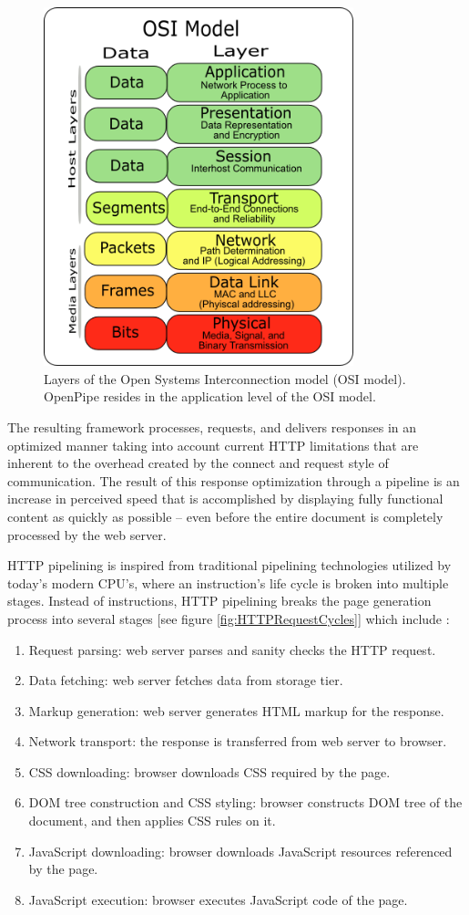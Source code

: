 \documentclass[12pt]{report}
\begin{document}
\begin{figure}[H]
\label{fig:osiModel}
\centering
\includegraphics[width=90mm]{figures/images/osi_model.png}
\caption{Layers of the Open Systems Interconnection model (OSI model). OpenPipe resides in the application level of the OSI model.}
\end{figure}

The resulting framework processes, requests, and delivers responses in an optimized manner taking into account current HTTP limitations that are inherent to the overhead created by the connect and request style of communication. The result of this response optimization through a pipeline is an increase in perceived speed that is accomplished by displaying fully functional content as quickly as possible – even before the entire document is completely processed by the web server.

HTTP pipelining is inspired from traditional pipelining technologies utilized by today’s modern CPU's, where an instruction's life cycle is broken into multiple stages. Instead of instructions, HTTP pipelining breaks the page generation process into several stages [see figure \ref{fig:HTTPRequestCycles}] which include \cite{facebookBigpipe}:

\begin{enumerate}
  \item Request parsing: web server parses and sanity checks the HTTP request. 
  \item Data fetching: web server fetches data from storage tier.
  \item Markup generation: web server generates HTML markup for the response. 
  \item Network transport: the response is transferred from web server to browser.
  \item CSS downloading: browser downloads CSS required by the page. 
  \item DOM tree construction and CSS styling: browser constructs DOM tree of the document, and then applies CSS rules on it.
  \item JavaScript downloading: browser downloads JavaScript resources referenced by the page.
  \item JavaScript execution: browser executes JavaScript code of the page.
\end{enumerate}
\end{document}

